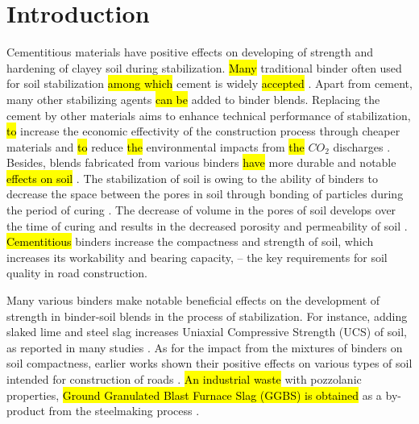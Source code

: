 \documentclass[electronics,article,submit,pdftex,moreauthors]{Definitions/mdpi}
\begin{document}
\section{Introduction}

Cementitious materials have positive effects on developing of strength and hardening of clayey soil during stabilization. \hl{Many} traditional binder often used for soil stabilization \hl{among which} cement is\hl{ }widely\hl{ accepted} \cite{Moh,Lindh2021a,Lapointe,ZhangTao}. Apart from cement, many other stabilizing agents \hl{can be} added to binder blends. Replacing the cement by other materials aims to enhance technical performance of stabilization, \hl{to} increase the economic effectivity of the construction process through cheaper materials and \hl{to} reduce \hl{the} environmental impacts from \hl{the} $CO_2$ discharges \cite{Joulazadeh,Yietal2014,Renjith}. Besides,\hl{ }blends fabricated from various binders \hl{have} more durable and notable \hl{effects on soil} \cite{Lindh2022b,Mariri,Fasihnikoutalab}. The stabilization of soil is owing to the ability of binders to decrease the space between the pores in soil through bonding of particles during the period of curing \cite{Lindh2021b,Bahrekazemi}. The decrease of volume in the pores of soil develops over the time of curing and results in the decreased porosity and permeability of soil \cite{Lindh2022b,Mariri,Fasihnikoutalab}. \hl{Cementitious} binders increase the compactness and strength of soil, which\hl{ }increases its workability and bearing capacity, – the key requirements for soil quality in road construction.	

Many various binders make notable beneficial effects on the development of strength in binder-soil blends in the process of stabilization. For instance, adding slaked lime and steel slag increases Uniaxial Compressive Strength (UCS) of soil, as reported in many studies \cite{Lindh2021b,Bahrekazemi,Lindh2022c}. As for the impact from the mixtures of binders on soil compactness, earlier works shown their positive effects on various types of soil intended for construction of roads \cite{Dahlin,Nordmark,Kallen}. \hl{An industrial waste} with pozzolanic properties, \hl{Ground Granulated Blast Furnace Slag (GGBS) is obtained }as a by-product from the steelmaking process \cite{Aziz}. 
\end{document}
